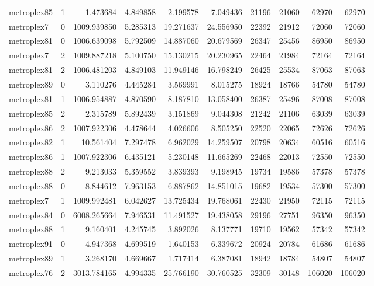 \begin{longtable}{|l|r|r|r|r|r|r|r|r|r|}
metroplex85 & 1 & 1.473684 & 4.849858 & 2.199578 & 7.049436 & 21196 & 21060 & 62970 & 62970 \\
metroplex7 & 0 & 1009.939850 & 5.285313 & 19.271637 & 24.556950 & 22392 & 21912 & 72060 & 72060 \\
metroplex81 & 0 & 1006.639098 & 5.792509 & 14.887060 & 20.679569 & 26347 & 25456 & 86950 & 86950 \\
metroplex7 & 2 & 1009.887218 & 5.100750 & 15.130215 & 20.230965 & 22464 & 21984 & 72164 & 72164 \\
metroplex81 & 2 & 1006.481203 & 4.849103 & 11.949146 & 16.798249 & 26425 & 25534 & 87063 & 87063 \\
metroplex89 & 0 & 3.110276 & 4.445284 & 3.569991 & 8.015275 & 18924 & 18766 & 54780 & 54780 \\
metroplex81 & 1 & 1006.954887 & 4.870590 & 8.187810 & 13.058400 & 26387 & 25496 & 87008 & 87008 \\
metroplex85 & 2 & 2.315789 & 5.892439 & 3.151869 & 9.044308 & 21242 & 21106 & 63039 & 63039 \\
metroplex86 & 2 & 1007.922306 & 4.478644 & 4.026606 & 8.505250 & 22520 & 22065 & 72626 & 72626 \\
metroplex82 & 1 & 10.561404 & 7.297478 & 6.962029 & 14.259507 & 20798 & 20634 & 60516 & 60516 \\
metroplex86 & 1 & 1007.922306 & 6.435121 & 5.230148 & 11.665269 & 22468 & 22013 & 72550 & 72550 \\
metroplex88 & 2 & 9.213033 & 5.359552 & 3.839393 & 9.198945 & 19734 & 19586 & 57378 & 57378 \\
metroplex88 & 0 & 8.844612 & 7.963153 & 6.887862 & 14.851015 & 19682 & 19534 & 57300 & 57300 \\
metroplex7 & 1 & 1009.992481 & 6.042627 & 13.725434 & 19.768061 & 22430 & 21950 & 72115 & 72115 \\
metroplex84 & 0 & 6008.265664 & 7.946531 & 11.491527 & 19.438058 & 29196 & 27751 & 96350 & 96350 \\
metroplex88 & 1 & 9.160401 & 4.245745 & 3.892026 & 8.137771 & 19710 & 19562 & 57342 & 57342 \\
metroplex91 & 0 & 4.947368 & 4.699519 & 1.640153 & 6.339672 & 20924 & 20784 & 61686 & 61686 \\
metroplex89 & 1 & 3.268170 & 4.669667 & 1.717414 & 6.387081 & 18942 & 18784 & 54807 & 54807 \\
metroplex76 & 2 & 3013.784165 & 4.994335 & 25.766190 & 30.760525 & 32309 & 30148 & 106020 & 106020 \\

\end{longtable}
